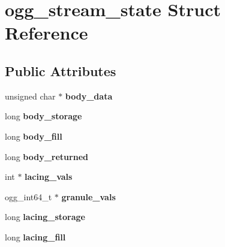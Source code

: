 \hypertarget{structogg__stream__state}{\section{ogg\+\_\+stream\+\_\+state Struct Reference}
\label{structogg__stream__state}
}
\subsection*{Public Attributes}
\begin{DoxyCompactItemize}
\item 
\hypertarget{structogg__stream__state_a2976fd10bbeea76b5da1589ee9b38e6d}{unsigned char $\ast$ {\bfseries body\+\_\+data}}\label{structogg__stream__state_a2976fd10bbeea76b5da1589ee9b38e6d}

\item 
\hypertarget{structogg__stream__state_acc4cf19d7e31e1a6daab8f76fdb0afd6}{long {\bfseries body\+\_\+storage}}\label{structogg__stream__state_acc4cf19d7e31e1a6daab8f76fdb0afd6}

\item 
\hypertarget{structogg__stream__state_a19d45a7b5004f13ae02b5a9502354b93}{long {\bfseries body\+\_\+fill}}\label{structogg__stream__state_a19d45a7b5004f13ae02b5a9502354b93}

\item 
\hypertarget{structogg__stream__state_a602e02c9b0d5653eea5bd4f97bade116}{long {\bfseries body\+\_\+returned}}\label{structogg__stream__state_a602e02c9b0d5653eea5bd4f97bade116}

\item 
\hypertarget{structogg__stream__state_a18de456d56b5c128374a3e4040d6bfbe}{int $\ast$ {\bfseries lacing\+\_\+vals}}\label{structogg__stream__state_a18de456d56b5c128374a3e4040d6bfbe}

\item 
\hypertarget{structogg__stream__state_a0e273bf5c51e59b8d0e1f2061eb5c756}{ogg\+\_\+int64\+\_\+t $\ast$ {\bfseries granule\+\_\+vals}}\label{structogg__stream__state_a0e273bf5c51e59b8d0e1f2061eb5c756}

\item 
\hypertarget{structogg__stream__state_a23844488216514760bc66b38dfd6d4ae}{long {\bfseries lacing\+\_\+storage}}\label{structogg__stream__state_a23844488216514760bc66b38dfd6d4ae}

\item 
\hypertarget{structogg__stream__state_a6090ad58db768aa90218b0bc421d6f0e}{long {\bfseries lacing\+\_\+fill}}\label{structogg__stream__state_a6090ad58db768aa90218b0bc421d6f0e}


\end{DoxyCompactItemize}
